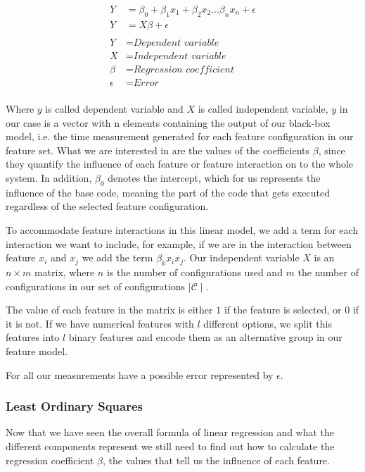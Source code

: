 \begin{align*}\label{formula:linReg}
    Y &= \beta_0 + \beta_1 x_1 + \beta_2 x_2 ... \beta_n x_n + \epsilon   \\
    Y &= X \beta + \epsilon \\\\
    Y &= \textit{Dependent variable}\\
    X &= \textit{Independent variable}\\
    \beta &= \textit{Regression coefficient}\\
    \epsilon &= \textit{Error}\\
\end{align*}


Where $y$ is called dependent variable and $X$ is called independent variable, $y$ in our case is a vector with n elements containing
the output of our black-box model, i.e. the time measurement generated for each feature configuration in our feature set. What we
are interested in are the values of the coefficients $\beta$, since they quantify the influence of each feature or feature interaction
on to the whole system. In addition, $\beta_0$ denotes the intercept, which for us represents the influence of the base code, meaning
the part of the code that gets executed regardless of the selected feature configuration.

To accommodate feature interactions in this linear model, we add a term for each interaction we want to include, for example,
if we are in the interaction between feature $x_i$ and $x_j$ we add the term $\beta_k x_i x_j$. 
Our independent variable $X$ is an $n \times m$ matrix, where $n$ is the number of configurations used and $m$ the number of configurations
in our set of configurations $\mid \mathcal{C} \mid$.

The value of each feature in the matrix is either $1$ if the feature is selected, or $0$ if it is not. If we have numerical features with $l$
different options, we split this features into $l$ binary features and encode them as an alternative group in our feature model.

For all our measurements have a possible error represented by $\epsilon$. \cite{Linear-Regression}

\subsubsection{Least Ordinary Squares}
Now that we have seen the overall formula of linear regression and what the different components represent we still need to find out 
how to calculate the regression coefficient $\beta$, the values that tell us the influence of each feature. 

